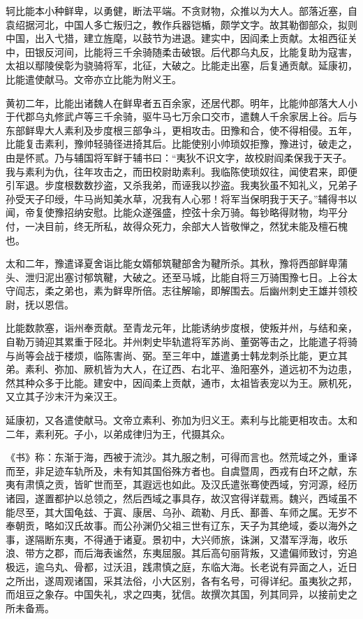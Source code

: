 \documentclass[12pt,UTF8]{ctexbook}
\begin{document}
轲比能本小种鲜卑，以勇健，断法平端。不贪财物，众推以为大人。部落近塞，自袁绍据河北，中国人多亡叛归之，教作兵器铠楯，颇学文字。故其勒御部众，拟则中国，出入弋猎，建立旌麾，以鼓节为进退。建实中，因阎柔上贡献。太祖西征关中，田银反河间，比能将三千余骑随柔击破银。后代郡乌丸反，比能复助为寇害，太祖以鄢陵侯彰为骁骑将军，北征，大破之。比能走出塞，后复通贡献。延康初，比能遣使献马。文帝亦立比能为附义王。

黄初二年，比能出诸魏人在鲜卑者五百余家，还居代郡。明年，比能帅部落大人小于代郡乌丸修武卢等三千余骑，驱牛马七万余口交市，遣魏人千余家居上谷。后与东部鲜卑大人素利及步度根三部争斗，更相攻击。田豫和合，使不得相侵。五年，比能复击素利，豫帅轻骑径进掎其后。比能使别小帅琐奴拒豫，豫进讨，破走之，由是怀贰。乃与辅国将军鲜于辅书曰：“夷狄不识文字，故校尉阎柔保我于天子。我与素利为仇，往年攻击之，而田校尉助素利。我临陈使琐奴往，闻使君来，即便引军退。步度根数数抄盗，又杀我弟，而诬我以抄盗。我夷狄虽不知礼义，兄弟子孙受天子印绶，牛马尚知美水草，况我有人心邪！将军当保明我于天子。”辅得书以闻，帝复使豫招纳安慰。比能众遂强盛，控弦十余万骑。每钞略得财物，均平分付，一决目前，终无所私，故得众死力，余部大人皆敬惮之，然犹未能及檀石槐也。

太和二年，豫遣译夏舍诣比能女婿郁筑鞬部舍为鞬所杀。其秋，豫将西部鲜卑蒲头、泄归泥出塞讨郁筑鞬，大破之。还至马城，比能自将三万骑围豫七日。上谷太守阎志，柔之弟也，素为鲜卑所倍。志往解喻，即解围去。后幽州刺史王雄并领校尉，抚以恩信。

比能数款塞，诣州奉贡献。至青龙元年，比能诱纳步度根，使叛并州，与结和亲，自勒万骑迎其累重于陉北。并州刺史毕轨遣将军苏尚、董弼等击之，比能遣子将骑与尚等会战于楼烦，临陈害尚、弼。至三年中，雄遣勇士韩龙刺杀比能，更立其弟。素利、弥加、厥机皆为大人，在辽西、右北平、渔阳塞外，道远初不为边患，然其种众多于比能。建安中，因阎柔上贡献，通市，太祖皆表宠以为王。厥机死，又立其子沙末汗为亲汉王。

延康初，又各遣使献马。文帝立素利、弥加为归义王。素利与比能更相攻击。太和二年，素利死。子小，以弟成律归为王，代摄其众。

《书》称：东渐于海，西被于流沙。其九服之制，可得而言也。然荒域之外，重译而至，非足迹车轨所及，未有知其国俗殊方者也。自虞暨周，西戎有白环之献，东夷有肃慎之贡，皆旷世而至，其遐远也如此。及汉氏遣张骞使西域，穷河源，经历诸园，遂置都护以总领之，然后西域之事具存，故汉宫得详载焉。魏兴，西域虽不能尽至，其大国龟兹、于寘、康居、乌孙、疏勒、月氏、鄯善、车师之属。无岁不奉朝贡，略如汉氏故事。而公孙渊仍父祖三世有辽东，天子为其绝域，委以海外之事，遂隔断东夷，不得通于诸夏。景初中，大兴师旅，诛渊，又潜军浮海，收乐浪、带方之郡，而后海表谧然，东夷屈服。其后高句丽背叛，又遣偏师致讨，穷追极远，逾乌丸、骨都，过沃沮，践肃慎之庭，东临大海。长老说有异面之人，近日之所出，遂周观诸国，采其法俗，小大区别，各有名号，可得详纪。虽夷狄之邦，而俎豆之象存。中国失礼，求之四夷，犹信。故撰次其国，列其同异，以接前史之所未备焉。
\end{document}
